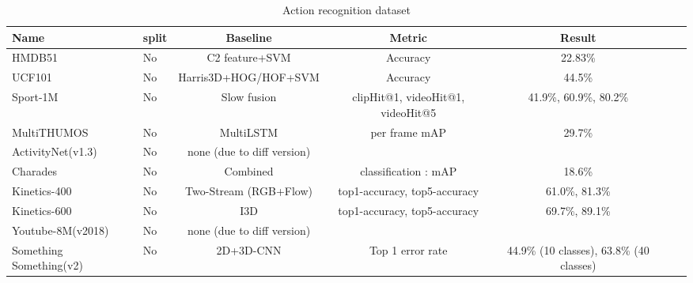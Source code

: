 \documentclass[a4paper]{article}
\begin{document}
\begin{table}
	\centering
	\smaller[0.5]
	\caption{Action recognition dataset}
	\renewcommand{\arraystretch}{1.5}
	\begin{tabular}{l|l|c c c c c}
		\toprule
		Name                    & split         & Baseline                   & Metric                                     & Result                                               \\
		\hline
		HMDB51                  & No            & C2  feature+SVM            & Accuracy                                   & 22.83\%                                              \\
		UCF101                  & No            & Harris3D+HOG/HOF+SVM       & Accuracy                                   & 44.5\%                                               \\
		Sport-1M                & No            & Slow fusion                & clipHit@1, videoHit@1, videoHit@5          & 41.9\%, 60.9\%, 80.2\%                               \\
		MultiTHUMOS             & No            & MultiLSTM                  & per frame mAP                              & 29.7\%                                               \\
		ActivityNet(v1.3)       & No            & none (due to diff version) &                                            &                                                      \\ 
		Charades                & No            & Combined                   & classification : mAP                       & 18.6\%                                               \\
		Kinetics-400            & No            & Two-Stream (RGB+Flow)      & top1-accuracy, top5-accuracy               & 61.0\%, 81.3\%                                       \\
		Kinetics-600            & No            & I3D                        & top1-accuracy, top5-accuracy               & 69.7\%, 89.1\%                                       \\
		Youtube-8M(v2018)       & No            & none (due to diff version) &                                            &                                                      \\
		Something Something(v2) & No            & 2D+3D-CNN                  & Top 1 error rate                           & 44.9\% (10 classes), 63.8\% (40 classes)             \\

\end{tabular}
\end{table}
\end{document}

